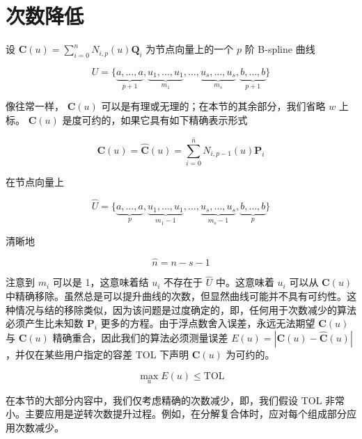 \documentclass[../main.tex]{subfiles}
\begin{document}
\section{次数降低} %

设 \(\mathbf{C}\left( u\right)  = \mathop{\sum }\limits_{{i = 0}}^{n}{N}_{i,p}\left( u\right) {\mathbf{Q}}_{i}\) 为节点向量上的一个 \(p\) 阶 B-spline 曲线

\[
U = \{ \underset{p + 1}{\underbrace{a,\ldots ,a}},\underset{{m}_{1}}{\underbrace{{u}_{1},\ldots ,{u}_{1}}},\ldots ,\underset{{m}_{s}}{\underbrace{{u}_{s},\ldots ,{u}_{s}}},\underset{p + 1}{\underbrace{b,\ldots ,b}}\}
\]

像往常一样， \(\mathbf{C}\left( u\right)\) 可以是有理或无理的；在本节的其余部分，我们省略 \(w\) 上标。 \(\mathbf{C}\left( u\right)\) 是度可约的，如果它具有如下精确表示形式

\[
\mathbf{C}\left( u\right)  = \widehat{\mathbf{C}}\left( u\right)  = \mathop{\sum }\limits_{{i = 0}}^{\widehat{n}}{N}_{i,p - 1}\left( u\right) {\mathbf{P}}_{i} \tag{5.37}
\]

在节点向量上

\[
\widehat{U} = \{ \underset{p}{\underbrace{a,\ldots ,a}},\underset{{m}_{1} - 1}{\underbrace{{u}_{1},\ldots ,{u}_{1}}},\ldots ,\underset{{m}_{s} - 1}{\underbrace{{u}_{s},\ldots ,{u}_{s}}},\underset{p}{\underbrace{b,\ldots ,b}}\}  \tag{5.38}
\]

清晰地

\[
\widehat{n} = n - s - 1 \tag{5.39}
\]

注意到 \({m}_{i}\) 可以是 1，这意味着结 \({u}_{i}\) 不存在于 \(\widehat{U}\) 中。这意味着 \({u}_{i}\) 可以从 \(\mathbf{C}\left( u\right)\) 中精确移除。虽然总是可以提升曲线的次数，但显然曲线可能并不具有可约性。这种情况与结的移除类似，因为该问题是过度确定的，即，任何用于次数减少的算法必须产生比未知数 \({\mathbf{P}}_{i}\) 更多的方程。由于浮点数舍入误差，永远无法期望 \(\widehat{\mathbf{C}}\left( u\right)\) 与 \(\mathbf{C}\left( u\right)\) 精确重合，因此我们的算法必须测量误差 \(E\left( u\right)  = \left| {\mathbf{C}\left( u\right)  - \widehat{\mathbf{C}}\left( u\right) }\right|\) ，并仅在某些用户指定的容差 TOL 下声明 \(\mathbf{C}\left( u\right)\) 为可约的。

\[
\mathop{\max }\limits_{u}E\left( u\right)  \leq  \mathrm{{TOL}}
\]

在本节的大部分内容中，我们仅考虑精确的次数减少，即，我们假设 TOL 非常小。主要应用是逆转次数提升过程。例如，在分解复合体时，应对每个组成部分应用次数减少。
\end{document}
